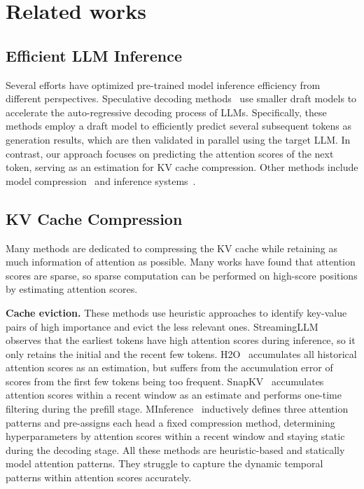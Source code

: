 \section{Related works}
\subsection{Efficient LLM Inference}
Several efforts have optimized pre-trained model inference efficiency from different perspectives.
Speculative decoding methods~\citep{cai2024medusa, li2024eagle, sun2024triforce, liu2024deepseekv3} use smaller draft models to accelerate the auto-regressive decoding process of LLMs. 
Specifically, these methods employ a draft model to efficiently predict several subsequent tokens as generation results, which are then validated in parallel using the target LLM.
In contrast, our approach focuses on predicting the attention scores of the next token, serving as an estimation for KV cache compression.
Other methods include model compression~\citep{frantar2023gptq, lin2024awq} and inference systems~\citep{kwon2023vllm, sheng2023flexgen, song2024tackling, 2023lmdeploy, zheng2024sglang, ye2025flashinfer}.


\subsection{KV Cache Compression}
Many methods are dedicated to compressing the KV cache while retaining as much information of attention as possible.
Many works have found that attention scores are sparse, so sparse computation can be performed on high-score positions by estimating attention scores.

\textbf{Cache eviction.} These methods use heuristic approaches to identify key-value pairs of high importance and evict the less relevant ones.
StreamingLLM~\citep{xiao2024streamingllm} observes that the earliest tokens have high attention scores during inference, so it only retains the initial and the recent few tokens.
H2O~\citep{zhang2023h2o} accumulates all historical attention scores as an estimation, but suffers from the accumulation error of scores from the first few tokens being too frequent. 
SnapKV~\citep{li2024snapkv} accumulates attention scores within a recent window as an estimate and performs one-time filtering during the prefill stage.
MInference~\citep{jiang2024minference} inductively defines three attention patterns and pre-assigns each head a fixed compression method, determining hyperparameters by attention scores within a recent window and staying static during the decoding stage.
All these methods are heuristic-based and statically model attention patterns. 
They struggle to capture the dynamic temporal patterns within attention scores accurately.

